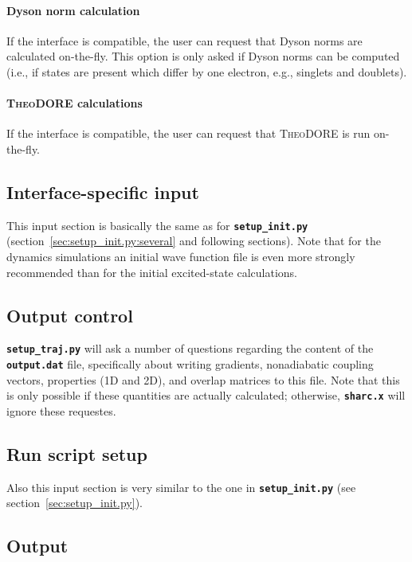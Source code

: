 \documentclass[a4paper,10pt,DIV=15,openany]{scrbook}
\newcommand{\ttt}[1]{\textbf{\texttt{#1}}}
\begin{document}
\paragraph{Dyson norm calculation}

If the interface is compatible, the user can request that Dyson norms are calculated on-the-fly. This option is only asked if Dyson norms can be computed (i.e., if states are present which differ by one electron, e.g., singlets and doublets).

\paragraph{\textsc{TheoDORE} calculations}

If the interface is compatible, the user can request that \textsc{TheoDORE} is run on-the-fly. 


\subsection{Interface-specific input}

This input section is basically the same as for \ttt{setup\_init.py} (section~\ref{sec:setup_init.py:several} and following sections). Note that for the dynamics simulations an initial wave function file is even more strongly recommended than for the initial excited-state calculations.

\subsection{Output control}

\ttt{setup\_traj.py} will ask a number of questions regarding the content of the \ttt{output.dat} file, specifically about writing gradients, nonadiabatic coupling vectors, properties (1D and 2D), and overlap matrices to this file.
Note that this is only possible if these quantities are actually calculated; otherwise, \ttt{sharc.x} will ignore these requestes.

\subsection{Run script setup}

Also this input section is very similar to the one in \ttt{setup\_init.py} (see section~\ref{sec:setup_init.py}).

\subsection{Output}
\end{document}
